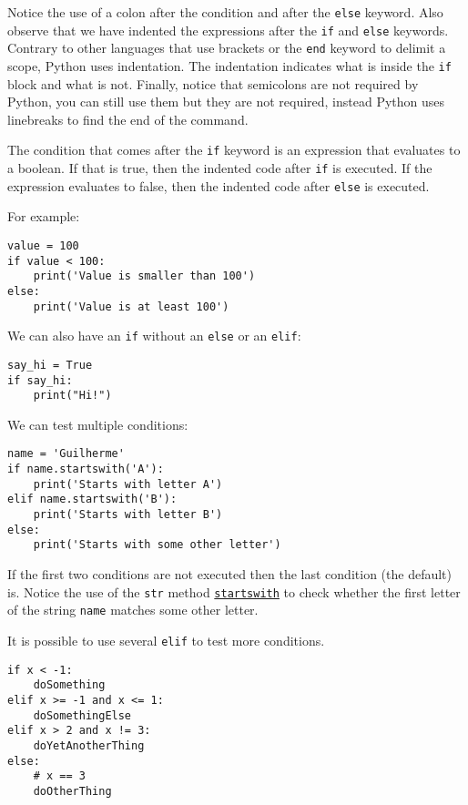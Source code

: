 \documentclass[12pt, a4paper]{article}
\begin{document}
Notice the use of a colon after the condition and after the \texttt{else} keyword.
Also observe that we have indented the expressions after the \texttt{if} and \texttt{else} keywords.
Contrary to other languages that use brackets or the \texttt{end} keyword to delimit a scope, Python uses indentation.
The indentation indicates what is inside the \texttt{if} block and what is not.
Finally, notice that semicolons are not required by Python, you can still use them but they are not required, instead Python uses linebreaks to find the end of the command.

The condition that comes after the \texttt{if} keyword is an expression that evaluates to a boolean. If that is true, then the indented code after \texttt{if}  is executed. If the expression evaluates to false, then the indented code after \texttt{else} is executed.

For example:
\lstset{language=jupyter-python,label= ,caption= ,captionpos=b,numbers=none}
\begin{lstlisting}
value = 100
if value < 100:
    print('Value is smaller than 100')
else:
    print('Value is at least 100')
\end{lstlisting}

We can also have an \texttt{if} without an \texttt{else} or an \texttt{elif}:
\lstset{language=jupyter-python,label= ,caption= ,captionpos=b,numbers=none}
\begin{lstlisting}
say_hi = True
if say_hi:
    print("Hi!")
\end{lstlisting}

We can test multiple conditions:
\lstset{language=jupyter-python,label= ,caption= ,captionpos=b,numbers=none}
\begin{lstlisting}
name = 'Guilherme'
if name.startswith('A'):
    print('Starts with letter A')
elif name.startswith('B'):
    print('Starts with letter B')
else:
    print('Starts with some other letter')
\end{lstlisting}
If the first two conditions are not executed then the last condition (the default) is.
Notice the use of the \texttt{str} method \href{https://docs.python.org/3.6/library/stdtypes.html?\#str.startswith}{\texttt{startswith}} to check whether the first letter of the string \texttt{name} matches some other letter.

It is possible to use several \texttt{elif} to test more conditions.
\lstset{language=jupyter-python,label= ,caption= ,captionpos=b,numbers=none}
\begin{lstlisting}
if x < -1:
    doSomething
elif x >= -1 and x <= 1:
    doSomethingElse
elif x > 2 and x != 3:
    doYetAnotherThing
else:
    # x == 3
    doOtherThing
\end{lstlisting}
\end{document}

